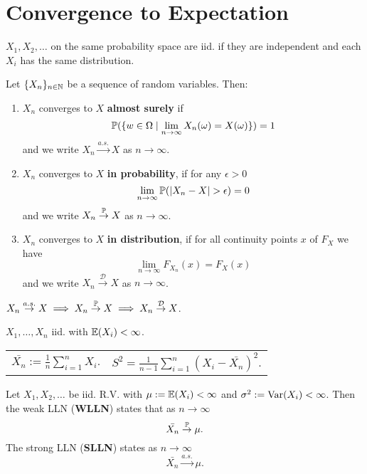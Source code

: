 \section{Convergence to Expectation}

\begin{definition*}
  \(X_1, X_2, \ldots\) on the same probability space are iid. if they are independent and each \(X_i\) has the same distribution.
\end{definition*}

\begin{definition*}
  Let \(\{X_n\}_{n \in \N}\) be a sequence of random variables. Then:
  \begin{enumerate}
    \item \(X_n\) converges to \(X\) \textbf{almost surely} if
    \[\P(\{w \in \Omega \mid \lim_{n\to\infty} X_n(\omega) = X(\omega)\}) = 1\]
    and we write \(X_n \stackrel{a.s.}{\to} X\) as \(n \to \infty\).
    \item \(X_n\) converges to \(X\) \textbf{in probability}, if for any \(\epsilon > 0\)
    \[\lim_{n \to \infty} \P(|X_n - X| > \epsilon) = 0\]
    and we write \(X_n \stackrel{\P}{\to} X\) as \(n \to \infty\).
    \item \(X_n\) converges to \(X\) \textbf{in distribution}, if for all continuity points \(x\) of \(F_X\) we have
    \[\lim_{n \to \infty} F_{X_n}(x) = F_X(x)\]
    and we write \(X_n \stackrel{\mathcal{D}}{\to} X\) as \(n \to \infty\).
  \end{enumerate}
\end{definition*}

\begin{lemma}
  \(X_n \stackrel{a.s.}{\to} X \implies X_n \stackrel{\P}{\to} X \implies X_n \stackrel{\mathcal{D}}{\to} X\).
\end{lemma}

\begin{definition*}
    \(X_1, \ldots, X_n\) iid. with \(\E(X_i) < \infty\).

    \begin{tabularx}{\linewidth}{ll}
      \(\bar{X_n} := \frac{1}{n}\sum_{i=1}^n X_i.\) & \(S^2 = \frac{1}{n-1}\sum_{i=1}^n(X_i - \bar{X_n})^2.\)
    \end{tabularx}
\end{definition*}

\begin{theorem*}
  Let \(X_1, X_2, \ldots\) be iid. R.V. with \(\mu := \E(X_i) < \infty\) and \(\sigma^2 := \Var(X_i) < \infty\). Then the weak LLN (\textbf{WLLN}) states that as \(n \to \infty\)
  \[\bar{X_n} \stackrel{\P}{\to} \mu.\]
  The strong LLN (\textbf{SLLN}) states as \(n \to \infty\)
  \[\bar{X_n} \stackrel{a.s.}{\to} \mu.\]
\end{theorem*}


